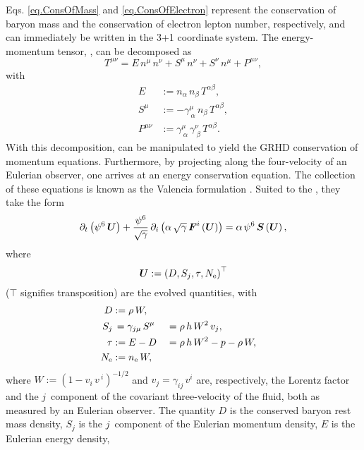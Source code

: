 Eqs. \eqref{eq.ConsOfMass} and \eqref{eq.ConsOfElectron}
represent the conservation of baryon mass
and the conservation of electron lepton number, respectively,
and can immediately be written in the 3+1 coordinate system.
The energy-momentum tensor, , can be decomposed as
\begin{equation}
  T^{\mu\nu}=E\,n^{\mu}\,n^{\nu}+S^{\mu}\,n^{\nu}+S^{\nu}\,n^{\mu}+P^{\mu\nu},
\end{equation}
with
\begin{align}
  E&:=n_{\alpha}\,n_{\beta}\,T^{\alpha\beta},\\
  S^{\mu}&:=-\gamma^{\mu}_{~\alpha}\,n_{\beta}\,T^{\alpha\beta},\\
  P^{\mu\nu}&:=\gamma^{\mu}_{~\alpha}\,\gamma^{\nu}_{~\beta}\,T^{\alpha\beta}.
\end{align}
With this decomposition,  can be manipulated to
yield the GRHD conservation of momentum equations.
Furthermore, by projecting  along the four-velocity
of an Eulerian observer, one arrives at an energy conservation equation.
The collection of these equations is known as the Valencia formulation
\citep{bfi1997,rz2013}.
Suited to the \xcfc, they take the form
\begin{equation}
  \partial_{t}\left(\psi^{6}\,\boldsymbol{U}\right)
  +\frac{\psi^{6}}{\sqrt{\gamma}}\,
  \partial_{i}\left(\alpha\,\sqrt{\gamma}\,\boldsymbol{F}^{i}\left(\boldsymbol{U}\right)\right)
  =\alpha\,\psi^{6}\,\boldsymbol{S}\left(\boldsymbol{U}\right),
  \label{eq.consLaws}
\end{equation}
where
\begin{equation}
  \boldsymbol{U}:=\left(D,S_{j},\tau,N_{\mathrm{e}}\right)^{\top}
\end{equation}
($\top$ signifies transposition)
are the evolved quantities, with
\begin{alignat}{2}
  D&:=\rho\,W,\\
  S_{j}&\,=\gamma_{j\mu}\,S^{\mu}&&=\rho\,h\,W^{2}\,v_{j},\\
  \tau&:=E-D&&=\rho\,h\,W^{2}-p-\rho\,W,\\
  N_{\mathrm{e}}&:=n_{\mathrm{e}}\,W,
\end{alignat}
where $W:=\left(1-v_{i}\,v\,^{i}\right)^{-1/2}$ and $v_{j}=\gamma_{ij}\,v^{i}$
are, respectively, the Lorentz factor and the $j$\myth\ component of the covariant
three-velocity of the fluid, both as measured by an Eulerian observer.
The quantity $D$ is the conserved baryon rest mass density,
$S_{j}$ is the $j$\myth\ component of the Eulerian momentum density,
$E$ is the Eulerian energy density,
